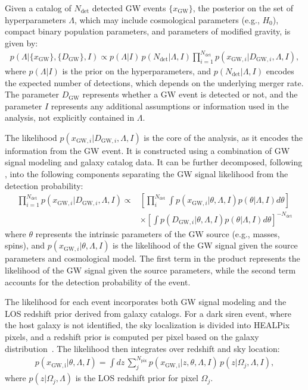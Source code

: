 Given a catalog of $N_{\mathrm{det}}$ detected \ac{GW} events $\{x_\mathrm{GW}\}$, the posterior on the set of hyperparameters $\Lambda$, which may include cosmological parameters (e.g., $H_0$), compact binary population parameters, and parameters of modified gravity, is given by:
\begin{align}
    p(\Lambda | \{x_\mathrm{GW}\},\{D_\mathrm{GW}\}, I) \propto p(\Lambda | I)\, p(N_{\mathrm{det}} | \Lambda, I) \prod_{i=1}^{N_{\mathrm{det}}} p(x_{\mathrm{GW},i} | D_{\mathrm{GW},i}, \Lambda, I),
\end{align}
where $p(\Lambda | I)$ is the prior on the hyperparameters, and $p(N_{\mathrm{det}} | \Lambda, I)$ encodes the expected number of detections, which depends on the underlying merger rate. The parameter $D_\mathrm{GW}$ represents whether a \ac{GW} event is detected or not, and the parameter $I$ represents any additional assumptions or information used in the analysis, not explicitly contained in $\Lambda$.

The likelihood $p(x_{\mathrm{GW},i} | D_{\mathrm{GW},i}, \Lambda, I)$ is the core of the analysis, as it encodes the information from the \ac{GW} event. It is constructed using a combination of \ac{GW} signal modeling and galaxy catalog data. It can be further decomposed, following \citet{chen2024testing}, into the following components separating the \ac{GW} signal likelihood from the detection probability:
\begin{align}
    \prod_{i=1}^{N_{\mathrm{det}}} p(x_{\mathrm{GW},i} | D_{\mathrm{GW},i}, \Lambda, I) \propto & \left[ \prod_i^{N_{\mathrm{det}}} \int p(x_{\mathrm{GW},i} | \theta, \Lambda, I) p(\theta | \Lambda, I) d\theta\right] \\ \nonumber
    & \times \left[ \int p(D_{\mathrm{GW},i} | \theta, \Lambda, I)p(\theta | \Lambda, I) d\theta \right]^{-N_{\mathrm{det}}}
\end{align}
where $\theta$ represents the intrinsic parameters of the \ac{GW} source (e.g., masses, spins), and $p(x_{\mathrm{GW},i} | \theta, \Lambda, I)$ is the likelihood of the \ac{GW} signal given the source parameters and cosmological model. The first term in the product represents the likelihood of the \ac{GW} signal given the source parameters, while the second term accounts for the detection probability of the event.

The likelihood for each event incorporates both \ac{GW} signal modeling and the \acf{LOS} redshift prior derived from galaxy catalogs. For a dark siren event, where the host galaxy is not identified, the sky localization is divided into HEALPix pixels, and a redshift prior is computed per pixel based on the galaxy distribution~\citep{gray2020cosmological,chen2024testing}. The likelihood then integrates over redshift and sky location:
\begin{align}
    p(x_{\mathrm{GW,i}} | \theta, \Lambda, I) = \int dz\, \sum_{j}^{N_{\mathrm{pix}}} p(x_{\mathrm{GW,i}} | z, \theta, \Lambda, I)\, p(z | \Omega_j, \Lambda, I),
\end{align}
where $p(z | \Omega_j, \Lambda)$ is the LOS redshift prior for pixel $\Omega_j$.

